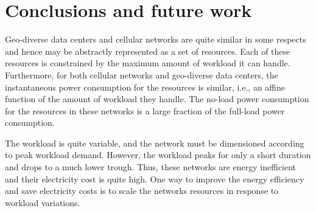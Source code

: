 \chapter{Conclusions and future work}
\label{chap:conclusions} Geo-diverse data centers and cellular networks are quite similar in some respects and hence may be abstractly represented as a set of resources. Each of these resources is constrained by the maximum amount of workload it can handle. Furthermore, for both cellular networks and geo-diverse data centers, the instantaneous power consumption for the resources is similar, i.e., an affine function of the amount of workload they handle. The no-load power consumption for the resources in these networks is a large fraction of the full-load power consumption. 

The workload is quite variable, and the network must be dimensioned according to peak workload demand. However, the workload peaks for only a short duration and drops to a much lower trough. Thus, these networks are energy inefficient and their electricity cost is quite high. One way to improve the energy efficiency and save electricity costs is to scale the networks resources in response to workload variations.

